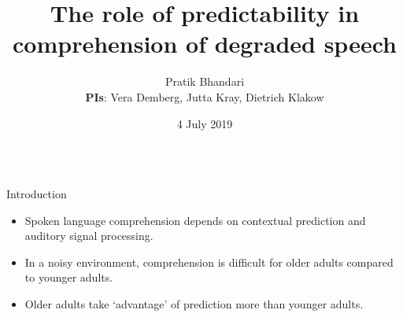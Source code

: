 \documentclass[final,12pt]{beamer}
\title{The role of predictability in comprehension of degraded speech}
\author{ Pratik Bhandari %
        \\
		{\normalsize \textbf{PIs}: Vera Demberg,
		Jutta Kray,
		Dietrich Klakow
		}}
\institute[UdS]{UdS, SFB 1102}
\date{4 July 2019}
\begin{document}
\begin{frame}[t]

\vspace{0.1em}



\begin{columns}[t]

\begin{block}{Introduction}
    \vspace{-2.3cm}
    \vspace{1.2em}
    \begin{itemize}
    
        \item {Spoken language comprehension depends on contextual prediction and auditory signal processing.}
            \vspace{0.3em}
        \item {In a noisy environment, comprehension is difficult for older adults compared to younger adults.}
            \vspace{0.3em}
        \item {Older adults take `advantage' of prediction more than younger adults.}
        
    \end{itemize}
\end{block}


\end{columns}
\end{frame}
\end{document}
